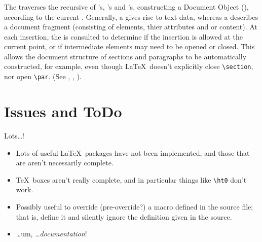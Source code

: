 \documentclass{article}
\begin{document}
\subsubsection{}
The  traverses the recursive  of 's, 
's and 's, constructing a Document Object (),
according to the current .  Generally, a  gives rise to text data, whereas
a  describes a document fragment (consisting of elements, thier attributes and or content).
At each insertion, the  is consulted to determine if the insertion is allowed at the
current point, or if intermediate elements may need to be opened or closed.
This allows the document structure of sections and paragraphs to be automatically
constructed, for example, even though \LaTeX\ doesn't explicitly close \verb|\section|,
nor open \verb|\par|.
(See ,  ,  ).


\section{Issues and ToDo}\label{app:todo}
Lots\ldots!
\begin{itemize}
\item Lots of useful \LaTeX\ packages have not been implemented, and those
  that are aren't necessarily complete.
\item \TeX\ boxes aren't really complete, and in particular things like \verb|\ht0|
  don't work.
\item Possibly useful to override (pre-override?) a macro defined in the source file;
  that is, define it and silently ignore the definition given in the source.
\item \ldots um, \ldots \emph{documentation}!
\end{itemize}
\end{document}
